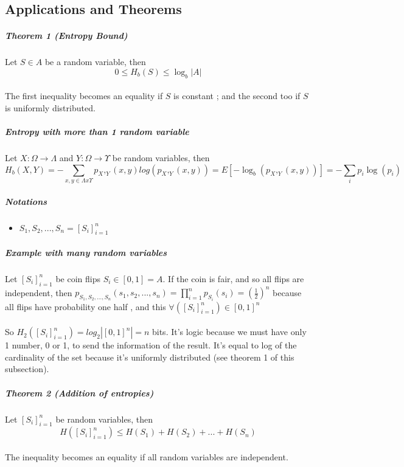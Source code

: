 \documentclass{article}
\begin{document}
\subsection{Applications and Theorems}
\subparagraph{Theorem 1 (Entropy Bound)} Let $ S \in A $ be a random variable, then
\begin{equation}
0 \leq H_b(S) \leq \log_b| A |
\end{equation}
\\
The first inequality becomes an equality if $ S $ is constant ; and the second too if $ S $ is uniformly distributed.

\subparagraph{Entropy with more than 1 random variable} Let $ X: \Omega \rightarrow \Lambda $ and $ Y: \Omega \rightarrow \Upsilon $ be random variables, then 
\begin{equation}
H_b(X, Y) = - \sum_{x, y \in \Lambda x \Upsilon}p_X,_Y(x, y)log(p_X,_Y(x, y)) = E[-\log_b(p_X,_Y(x, y))] = - \sum_{i}p_i\log(p_i)
\end{equation}

\subparagraph{Notations}
\begin{itemize}
\item $ S_1, S_2, ..., S_n = [S_i]_{i=1}^{n} $
\end{itemize}

\subparagraph{Example with many random variables}
Let $ [S_i]_{i=1}^{n} $ be coin flips $ S_i \in [0, 1] = A $. If the coin is fair, and so all flips are independent, then $ p_{S_1,S_2,...,S_n}(s_1, s_2, ..., s_n) = \prod_{i=1}^{n}p_{S_i}(s_i) = (\frac{1}{2})^n $ because all flips have probability one half , and this $ \forall ([S_i]_{i=1}^{n}) \in [0, 1]^n $
\\
\\
So $ H_2([S_i]_{i=1}^{n}) = log_2| [0, 1]^n | = n $ bits. It's logic because we must have only 1 number, 0 or 1, to send the information of the result. It's equal to log of the cardinality of the set because it's uniformly distributed (see theorem 1 of this subsection).

\subparagraph{Theorem 2 (Addition of entropies)} Let $ [S_i]_{i=1}^{n} $ be random variables, then
\begin{equation}
H([S_i]_{i=1}^{n}) \leq H(S_1) + H(S_2) + ... + H(S_n)
\end{equation}
\\
The inequality becomes an equality if all random variables are independent.
\end{document}
